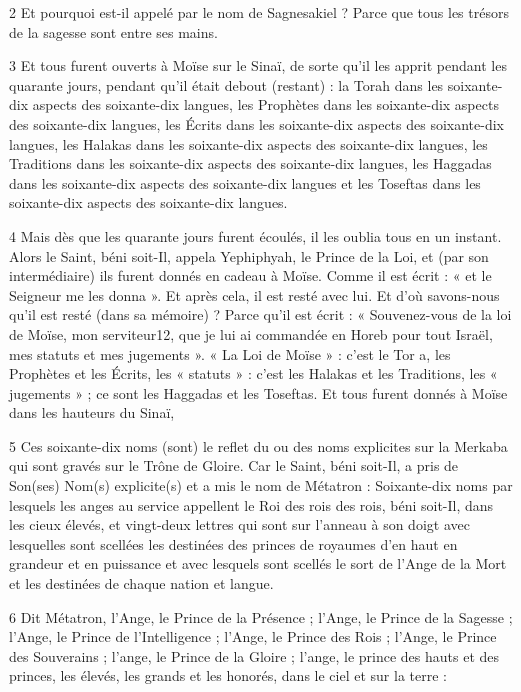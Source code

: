 \par 2 Et pourquoi est-il appelé par le nom de Sagnesakiel ? Parce que tous les trésors de la sagesse sont entre ses mains.

\par 3 Et tous furent ouverts à Moïse sur le Sinaï, de sorte qu'il les apprit pendant les quarante jours, pendant qu'il était debout (restant) : la Torah dans les soixante-dix aspects des soixante-dix langues, les Prophètes dans les soixante-dix aspects des soixante-dix langues, les Écrits dans les soixante-dix aspects des soixante-dix langues, les Halakas dans les soixante-dix aspects des soixante-dix langues, les Traditions dans les soixante-dix aspects des soixante-dix langues, les Haggadas dans les soixante-dix aspects des soixante-dix langues et les Toseftas dans les soixante-dix aspects des soixante-dix langues.

\par 4 Mais dès que les quarante jours furent écoulés, il les oublia tous en un instant. Alors le Saint, béni soit-Il, appela Yephiphyah, le Prince de la Loi, et (par son intermédiaire) ils furent donnés en cadeau à Moïse. Comme il est écrit : « et le Seigneur me les donna ». Et après cela, il est resté avec lui. Et d'où savons-nous qu'il est resté (dans sa mémoire) ? Parce qu'il est écrit : « Souvenez-vous de la loi de Moïse, mon serviteur12, que je lui ai commandée en Horeb pour tout Israël, mes statuts et mes jugements ». « La Loi de Moïse » : c'est le Tor a, les Prophètes et les Écrits, les « statuts » : c'est les Halakas et les Traditions, les « jugements » ; ce sont les Haggadas et les Toseftas. Et tous furent donnés à Moïse dans les hauteurs du Sinaï,

\par 5 Ces soixante-dix noms (sont) le reflet du ou des noms explicites sur la Merkaba qui sont gravés sur le Trône de Gloire. Car le Saint, béni soit-Il, a pris de Son(ses) Nom(s) explicite(s) et a mis le nom de Métatron : Soixante-dix noms par lesquels les anges au service appellent le Roi des rois des rois, béni soit-Il, dans les cieux élevés, et vingt-deux lettres qui sont sur l'anneau à son doigt avec lesquelles sont scellées les destinées des princes de royaumes d'en haut en grandeur et en puissance et avec lesquels sont scellés le sort de l'Ange de la Mort et les destinées de chaque nation et langue.

\par 6 Dit Métatron, l'Ange, le Prince de la Présence ; l'Ange, le Prince de la Sagesse ; l'Ange, le Prince de l'Intelligence ; l'Ange, le Prince des Rois ; l'Ange, le Prince des Souverains ; l'ange, le Prince de la Gloire ; l'ange, le prince des hauts et des princes, les élevés, les grands et les honorés, dans le ciel et sur la terre :

